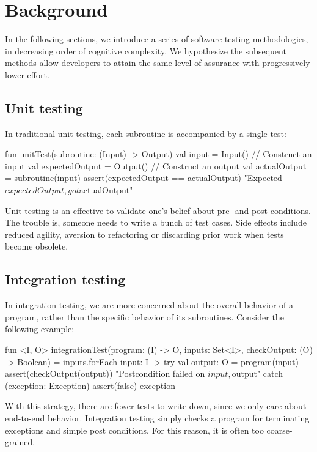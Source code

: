 \section{Background}

In the following sections, we introduce a series of software testing methodologies, in decreasing order of cognitive complexity. We hypothesize the subsequent methods allow developers to attain the same level of assurance with progressively lower effort.

\subsection{Unit testing}

\noindent In traditional unit testing, each subroutine is accompanied by a single test:
%
\begin{kotlinlisting}
fun unitTest(subroutine: (Input) -> Output) {
    val input = Input() // Construct an input
    val expectedOutput = Output() // Construct an output
    val actualOutput = subroutine(input)
    assert(expectedOutput == actualOutput) { "Expected $expectedOutput, got $actualOutput" }
}
\end{kotlinlisting}
%
Unit testing is an effective to validate one's belief about pre- and post-conditions. The trouble is, someone needs to write a bunch of test cases. Side effects include reduced agility, aversion to refactoring or discarding prior work when tests become obsolete.

\subsection{Integration testing}

\noindent In integration testing, we are more concerned about the overall behavior of a program, rather than the specific behavior of its subroutines. Consider the following example:

\begin{kotlinlisting}
fun <I, O> integrationTest(program: (I) -> O, inputs: Set<I>, checkOutput: (O) -> Boolean) =
    inputs.forEach { input: I ->
        try {
            val output: O = program(input)
            assert(checkOutput(output)) { "Postcondition failed on $input, $output" }
        } catch (exception: Exception) {
            assert(false) { exception }
        }
    }
\end{kotlinlisting}
%
With this strategy, there are fewer tests to write down, since we only care about end-to-end behavior. Integration testing simply checks a program for terminating exceptions and simple post conditions. For this reason, it is often too coarse-grained.


